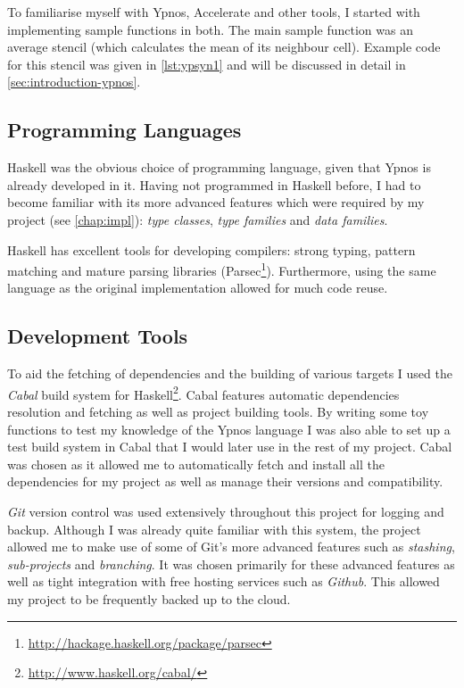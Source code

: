 \documentclass[
    12pt,
    a4paper,
    twoside,
    openright,
    ]{scrbook}
\begin{document}
To familiarise myself with Ypnos, Accelerate and other tools, I started with
implementing sample functions in both. The main sample function was an average
stencil (which calculates the mean of its neighbour cell). Example code for this
stencil was given in \autoref{lst:ypsyn1} and will be discussed in detail in
\autoref{sec:introduction-ypnos}.

\subsection{Programming Languages}

Haskell was the obvious choice of programming language, given that Ypnos is
already developed in it. Having not programmed in Haskell before, I had to
become familiar with its more advanced features which were required by my
project (see \autoref{chap:impl}): \emph{type classes}, \emph{type families} and
\emph{data families}.

Haskell has excellent tools for developing compilers: strong typing, pattern
matching and mature parsing libraries
(Parsec\footnote{\url{http://hackage.haskell.org/package/parsec}}).
Furthermore, using the same language as the original implementation allowed for
much code reuse.

\subsection{Development Tools}

To aid the fetching of dependencies and the building of various targets I used
the \emph{Cabal} build system for
Haskell\footnote{\url{http://www.haskell.org/cabal/}}. Cabal features automatic
dependencies resolution and fetching as well as project building tools. By
writing some toy functions to test my knowledge of the Ypnos language I was also
able to set up a test build system in Cabal that I would later use in the rest
of my project. Cabal was chosen as it allowed me to automatically fetch and
install all the dependencies for my project as well as manage their versions and
compatibility.

\emph{Git} version control was used extensively throughout this project for
logging and backup. Although I was already quite familiar with this system, the
project allowed me to make use of some of Git's more advanced features such as
\emph{stashing}, \emph{sub-projects} and \emph{branching}. It was chosen
primarily for these advanced features as well as tight integration with free
hosting services such as \emph{Github}. This allowed my project to be frequently
backed up to the cloud.
\end{document}
